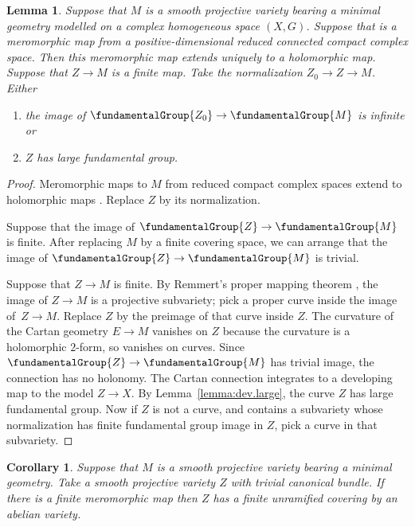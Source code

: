 \documentclass[10pt,a4paper]{amsart}
\numberwithin{equation}{section}
\newtheorem{Corollary}[Theorem]{Corollary}
\newtheorem{Lemma}[Theorem]{Lemma}
\begin{document}
\begin{Lemma}\label{lemma:large}
Suppose that $M$ is a smooth projective variety bearing a minimal geometry modelled on a complex homogeneous space $(X, G)$.
Suppose that  is a meromorphic map from a positive-dimensional reduced connected compact complex space.
Then this meromorphic map extends uniquely to a holomorphic map.
Suppose that $Z \to M$ is a finite map.
Take the normalization $Z_0 \to Z \to M$.
Either
\begin{enumerate}\itemsep=0pt
\item[$(1)$]
the image of $\fundamentalGroup{Z_0} \to \fundamentalGroup{M}$ is infinite or
\item[$(2)$]
$Z$ has large fundamental group.
\end{enumerate}
\end{Lemma}

\begin{proof}
Meromorphic maps to $M$ from reduced compact complex spaces extend to holomorphic maps \cite[Lemma 26]{Biswas.McKay:2016}.
Replace $Z$ by its normalization.

Suppose that the image of $\fundamentalGroup{Z} \to \fundamentalGroup{M}$ is finite.
After replacing $M$ by a finite covering space, we can arrange that the image of $\fundamentalGroup{Z}
\to \fundamentalGroup{M}$ is trivial.

Suppose that $Z \to M$ is finite.
By Remmert's proper mapping theorem \cite[p.~213]{Grauert.Remmert:1984}, the image of $Z
 \to M$ is a projective subvariety;
pick a proper curve inside the image of~${Z \to M}$.
Replace $Z$ by the preimage of that curve inside $Z$.
The curvature of the Cartan geometry ${E \to M}$ vanishes on $Z$ because the curvature is a holomorphic $2$-form, so vanishes on curves.
Since $\fundamentalGroup{Z} \to \fundamentalGroup{M}$ has trivial image, the connection has no holonomy.
The Cartan connection integrates to a developing map to the model $Z \to X$.
By Lemma~\ref{lemma:dev.large}, the curve $Z$ has large fundamental group.
Now if $Z$ is not a curve, and contains a subvariety whose normalization has
finite fundamental group image in $Z$, pick a curve in that subvariety.
\end{proof}

\begin{Corollary}\label{corollary:tori}
Suppose that $M$ is a smooth projective variety bearing a minimal geometry.
Take a smooth projective variety $Z$ with trivial canonical bundle.
If there is a finite meromorphic map  then $Z$ has a finite unramified covering by an abelian variety.
\end{Corollary}
\end{document}
